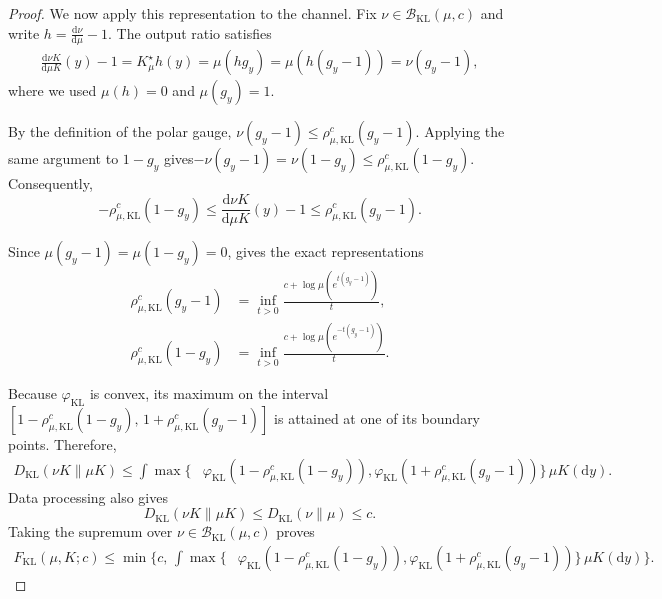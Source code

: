 \documentclass[11pt]{article}
\theoremstyle{plain}
\theoremstyle{remark}
\begin{document}
\begin{proof}
We now apply this representation to the channel. Fix
$\nu\in\mathcal B_{\mathrm{KL}}(\mu,c)$ and write $
    h
    =
    \frac{\mathrm d\nu}{\mathrm d\mu}-1.
$
The output ratio satisfies
\begin{align}
    \frac{\mathrm d\nu K}{\mathrm d\mu K}(y)-1
    =
    K_\mu^\star h(y)
    =
    \mu\left(hg_y\right)
    =
    \mu\left(h(g_y-1)\right)
    =
    \nu(g_y-1),
    \label{eq:klOutputLikelihoodRatioPerturbation}
\end{align}
where we used $\mu(h)=0$ and $\mu(g_y)=1$.

By the definition of the polar gauge, $
    \nu(g_y-1)
    \leq
    \rho_{\mu,\mathrm{KL}}^c(g_y-1).$
Applying the same argument to $1-g_y$ gives$
    -\nu(g_y-1)
    =
    \nu(1-g_y)
    \leq
    \rho_{\mu,\mathrm{KL}}^c(1-g_y).$
Consequently,
\begin{equation}
    -\rho_{\mu,\mathrm{KL}}^c(1-g_y)
    \leq
    \frac{\mathrm d\nu K}{\mathrm d\mu K}(y)-1
    \leq
    \rho_{\mu,\mathrm{KL}}^c(g_y-1).
    \label{eq:klOutputLikelihoodRatioInterval}
\end{equation}

Since $\mu(g_y-1)=\mu(1-g_y)=0$,
 gives the exact representations
\begin{align}
    \rho_{\mu,\mathrm{KL}}^c(g_y-1)
    &=
    \inf_{t>0}
    \frac{
        c+
        \log\mu\left(
            e^{t(g_y-1)}
        \right)
    }{t},
    \label{eq:klPositivePolarGaugeMGF}\\
    \rho_{\mu,\mathrm{KL}}^c(1-g_y)
    &=
    \inf_{t>0}
    \frac{
        c+
        \log\mu\left(
            e^{-t(g_y-1)}
        \right)
    }{t}.
    \label{eq:klNegativePolarGaugeMGF}
\end{align}

Because $\varphi_{\mathrm{KL}}$ is convex, its maximum on the interval$ 
    \left[
        1-\rho_{\mu,\mathrm{KL}}^c(1-g_y),
        \,
        1+\rho_{\mu,\mathrm{KL}}^c(g_y-1)
    \right]$ is attained at one of its boundary points. Therefore,
\begin{align}
    D_{\mathrm{KL}}(\nu K\|\mu K)
    \leq
    \int
    \max\Bigg\{&
        \varphi_{\mathrm{KL}}
        \left(
            1-\rho_{\mu,\mathrm{KL}}^c(1-g_y)
        \right),
        \varphi_{\mathrm{KL}}
        \left(
            1+\rho_{\mu,\mathrm{KL}}^c(g_y-1)
        \right)
    \Bigg\}
    \,\mu K(\mathrm dy).
    \label{eq:klPolarGaugeOutputBound}
\end{align}
Data processing also gives
\begin{equation}
    D_{\mathrm{KL}}(\nu K\|\mu K)
    \leq
    D_{\mathrm{KL}}(\nu\|\mu)
    \leq c.
\end{equation}
Taking the supremum over
$\nu\in\mathcal B_{\mathrm{KL}}(\mu,c)$ proves
\begin{align}
F_{\mathrm{KL}}(\mu,K;c)
\leq
\min\Bigg\{
c,\,
\int
\max\Bigg\{&
\varphi_{\mathrm{KL}}
\left(
    1-\rho_{\mu,\mathrm{KL}}^c(1-g_y)
\right),
\varphi_{\mathrm{KL}}
\left(
    1+\rho_{\mu,\mathrm{KL}}^c(g_y-1)
\right)
\Bigg\}
\,\mu K(\mathrm dy)
\Bigg\}.
\end{align}
\end{proof}
\end{document}
